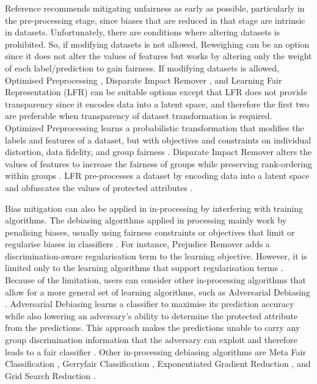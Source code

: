 \documentclass[sigconf]{acmart}
\begin{document}
	Reference \cite{mahoney2020ai} recommends mitigating unfairness as early as possible, particularly in the pre-processing stage, since biases that are reduced in that stage are intrinsic in datasets. Unfortunately, there are conditions where altering datasets is prohibited. So, if modifying datasets is not allowed, Reweighing \cite{kamiran2011reweighing} can be an option since it does not alter the values of features but works by altering only the weight of each label/prediction to gain fairness. If modifying datasets is allowed, Optimised Preprocessing \cite{calmon2017optimized}, Disparate Impact Remover \cite{feldman2015disparate}, and Learning Fair Representation (LFR) \cite{zemel2013lfr} can be suitable options except that LFR does not provide transparency since it encodes data into a latent space, and therefore the first two are preferable when transparency of dataset transformation is required.
	Optimized Preprocessing learns a probabilistic transformation that modifies the labels and features of a dataset, but with objectives and constraints on individual distortion, data fidelity, and group fairness \cite{mahoney2020ai,calmon2017optimized}.
	Disparate Impact Remover alters the values of features to increase the fairness of groups while preserving rank-ordering within groups \cite{mahoney2020ai,feldman2015disparate}.
	LFR pre-processes a dataset by encoding data into a latent space and obfuscates the values of protected attributes \cite{mahoney2020ai,zemel2013lfr}.
	
	Bias mitigation can also be applied in in-processing by interfering with training algorithms. The debiasing algorithms applied in processing mainly work by penalising biases, usually using fairness constraints or objectives that limit or regularise biases in classifiers \cite{mahoney2020ai}. For instance, Prejudice Remover \cite{kamishima2012prejudice} adds a discrimination-aware regularisation term to the learning objective. However, it is limited only to the learning algorithms that support regularisation terms \cite{mahoney2020ai,ibmaif3602022guidance}. Because of the limitation, users can consider other in-processing algorithms that allow for a more general set of learning algorithms, such as Adversarial Debiasing \cite{mahoney2020ai,ibmaif3602022guidance}. Adversarial Debiasing \cite{zhang2018adversarial} learns a classifier to maximise its prediction accuracy while also lowering an adversary's ability to determine the protected attribute from the predictions. This approach makes the predictions unable to carry any group discrimination information that the adversary can exploit and therefore leads to a fair classifier \cite{ibmaif3602022guidance}. Other in-processing debiasing algorithms are Meta Fair Classification \cite{celis2019metafair}, Gerryfair Classification \cite{kearns2018gerry,kearns2019gerry}, Exponentiated Gradient Reduction \cite{agarwal18grid}, and Grid Search Reduction \cite{agarwal18grid,agarwal19grid}.
	
\end{document}
